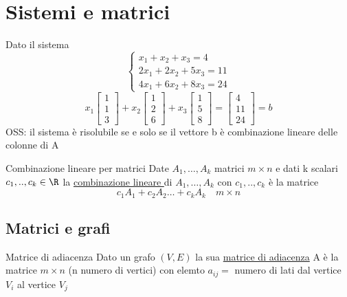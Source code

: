 \section{Sistemi e matrici}
\label{sec:sistemiematrici}

Dato il sistema
\[
	\begin{cases}
		x_1 + x_2 + x_3 = 4     \\
		2x_1 + 2x_2 + 5x_3 = 11 \\
		4x_1 + 6x_2 + 8x_3 = 24
	\end{cases}
\]
\[
	x_1 \begin{bmatrix} 1\\1\\3 \end{bmatrix}  + x_2 \begin{bmatrix} 1\\2\\6 \end{bmatrix} + x_3\begin{bmatrix} 1\\5\\8 \end{bmatrix} = \begin{bmatrix} 4\\11\\24 \end{bmatrix}= b
\]
OSS: il sistema è risolubile se e solo se il vettore b è combinazione lineare delle colonne di A
\begin{definizione}{Combinazione lineare per matrici}
	Date $A_1, \ldots , A_k$ matrici $m\times n$ e dati k scalari $c_1, .., c_k  \in  \R$ la \underline{ combinazione lineare }di $A_1, \ldots , A_k$ con $c_1, .., c_k$ è la matrice \[
		c_1A_1 + c_2 A_2 \ldots + c_k A_k \quad  m\times n
	\]
\end{definizione}

\subsection{Matrici e grafi}

\begin{definizione}{Matrice di adiacenza}
	Dato un grafo $ \left( V, E \right) $ la sua \underline{ matrice di adiacenza} A è la matrice $ m\times n $ (n numero di vertici) con elemto $a_{ij}=$ numero di lati dal vertice $V_i$ al vertice $V_j$
\end{definizione}

